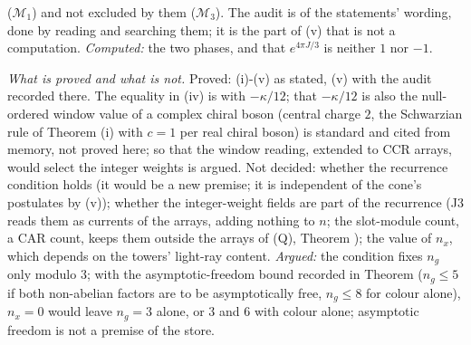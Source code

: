 ($\mathcal{M}_{1}$) and not excluded by them ($\mathcal{M}_{3}$). The audit is of the statements' wording, done by reading and searching them; it is the part of (v) that is not a computation. \emph{Computed:} the two phases, and that $e^{4\pi J/3}$ is neither $1$ nor $-1$.

\emph{What is proved and what is not.} Proved: (i)-(v) as stated, (v) with the audit recorded there. The equality in (iv) is with $-\kappa/12$; that $-\kappa/12$ is also the null-ordered window value of a complex chiral boson (central charge $2$, the Schwarzian rule of Theorem (i) with $c = 1$ per real chiral boson) is standard and cited from memory, not proved here; so that the window reading, extended to CCR arrays, would select the integer weights is argued. Not decided: whether the recurrence condition holds (it would be a new premise; it is independent of the cone's postulates by (v)); whether the integer-weight fields are part of the recurrence (J3 reads them as currents of the arrays, adding nothing to $n$; the slot-module count, a CAR count, keeps them outside the arrays of (Q), Theorem ); the value of $n_{x}$, which depends on the towers' light-ray content. \emph{Argued:} the condition fixes $n_{g}$ only modulo $3$; with the asymptotic-freedom bound recorded in Theorem  ($n_{g} \le 5$ if both non-abelian factors are to be asymptotically free, $n_{g} \le 8$ for colour alone), $n_{x} = 0$ would leave $n_{g} = 3$ alone, or $3$ and $6$ with colour alone; asymptotic freedom is not a premise of the store.
